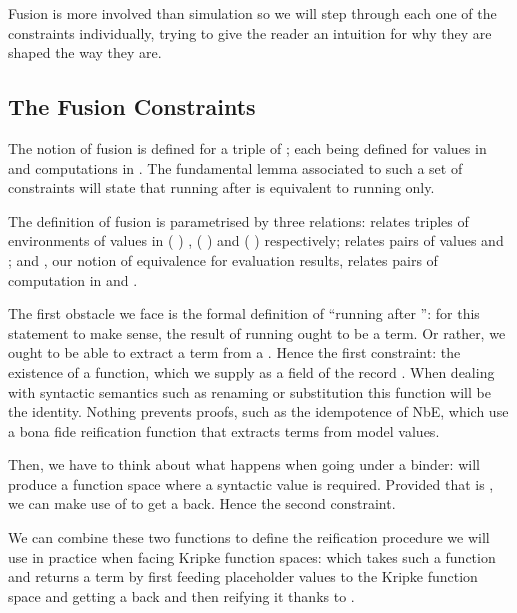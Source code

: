 Fusion is more involved than simulation so we will step through
each one of the constraints individually, trying to give the reader an intuition
for why they are shaped the way they are.


\subsection{The Fusion Constraints}

The notion of fusion is defined for a triple of ; each 
being defined for values in  and computations in . The
fundamental lemma associated to such a set of constraints will state that
running  after  is equivalent to running  only.

The definition of fusion is parametrised by three relations:  relates
triples of environments of values in {( )  },
{( )  } and {( )  }
respectively;  relates pairs of values  and ;
and , our notion of equivalence for evaluation results, relates pairs
of computation in  and .


The first obstacle we face is the formal definition of ``running 
after '': for this statement to make sense, the result of running
 ought to be a term. Or rather, we ought to be able to extract a
term from a . Hence the first constraint: the existence of a
 function, which we supply as a field of the record .
When dealing with syntactic semantics such as renaming or substitution
this function will be the identity. Nothing prevents proofs, such as the
idempotence of NbE, which use a bona fide reification function that extracts
terms from model values.


Then, we have to think about what happens when going under a binder: 
will produce a  function space where a syntactic value is required.
Provided that  is , we can make use of  to get a
 back. Hence the second constraint.


We can combine these two functions to define the reification procedure we will
use in practice when facing Kripke function spaces:  which takes such
a function and returns a term by first feeding placeholder values to the Kripke
function space and getting a  back and then reifying it thanks to .

